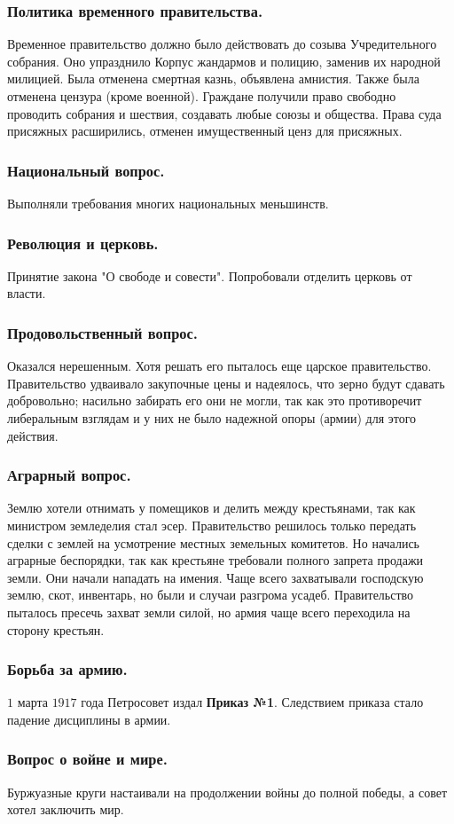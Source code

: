 \documentclass[12pt]{article}
\begin{document}
	\subsubsection{Политика временного правительства.}
	Временное правительство должно было действовать до созыва Учредительного собрания. Оно упразднило Корпус жандармов и полицию, заменив их народной милицией. Была отменена смертная казнь, объявлена амнистия. Также была отменена цензура (кроме военной). Граждане получили право свободно проводить собрания и шествия, создавать любые союзы и общества. Права суда присяжных расширились, отменен имущественный ценз для присяжных.
	\subsubsection{Национальный вопрос.}
	Выполняли требования многих национальных меньшинств.
	\subsubsection{Революция и церковь.}
	Принятие закона "О свободе и совести". Попробовали отделить церковь от власти.
	\subsubsection{Продовольственный вопрос.}
	Оказался нерешенным. Хотя решать его пыталось еще царское правительство. Правительство удваивало закупочные цены и надеялось, что зерно будут сдавать добровольно; насильно забирать его они не могли, так как это противоречит либеральным взглядам и у них не было надежной опоры (армии) для этого действия.
	\subsubsection{Аграрный вопрос.}
	Землю хотели отнимать у помещиков и делить между крестьянами, так как министром земледелия стал эсер. Правительство решилось только передать сделки с землей на усмотрение местных земельных комитетов. Но начались аграрные беспорядки, так как крестьяне требовали полного запрета продажи земли. Они начали нападать на имения. Чаще всего захватывали господскую землю, скот, инвентарь, но были и случаи разгрома усадеб. Правительство пыталось пресечь захват земли силой, но армия чаще всего переходила на сторону крестьян.
	\subsubsection{Борьба за армию.}
	$1$ марта $1917$ года Петросовет издал \textbf{Приказ №1}. Следствием приказа стало падение дисциплины в армии.
	\subsubsection{Вопрос о войне и мире.}
	Буржуазные круги настаивали на продолжении войны до полной победы, а совет хотел заключить мир.
\end{document}
